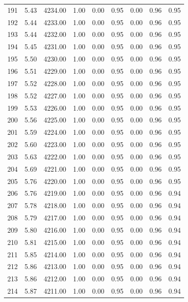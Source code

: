 \documentclass{article}\usepackage[]{graphicx}\usepackage[]{color}
\begin{document}
\begin{longtable}{rrrrrrrrr}
  191 & 5.43 & 4234.00 & 1.00 & 0.00 & 0.95 & 0.00 & 0.96 & 0.95 \\ 
  192 & 5.44 & 4233.00 & 1.00 & 0.00 & 0.95 & 0.00 & 0.96 & 0.95 \\ 
  193 & 5.44 & 4232.00 & 1.00 & 0.00 & 0.95 & 0.00 & 0.96 & 0.95 \\ 
  194 & 5.45 & 4231.00 & 1.00 & 0.00 & 0.95 & 0.00 & 0.96 & 0.95 \\ 
  195 & 5.50 & 4230.00 & 1.00 & 0.00 & 0.95 & 0.00 & 0.96 & 0.95 \\ 
  196 & 5.51 & 4229.00 & 1.00 & 0.00 & 0.95 & 0.00 & 0.96 & 0.95 \\ 
  197 & 5.52 & 4228.00 & 1.00 & 0.00 & 0.95 & 0.00 & 0.96 & 0.95 \\ 
  198 & 5.52 & 4227.00 & 1.00 & 0.00 & 0.95 & 0.00 & 0.96 & 0.95 \\ 
  199 & 5.53 & 4226.00 & 1.00 & 0.00 & 0.95 & 0.00 & 0.96 & 0.95 \\ 
  200 & 5.56 & 4225.00 & 1.00 & 0.00 & 0.95 & 0.00 & 0.96 & 0.95 \\ 
  201 & 5.59 & 4224.00 & 1.00 & 0.00 & 0.95 & 0.00 & 0.96 & 0.95 \\ 
  202 & 5.60 & 4223.00 & 1.00 & 0.00 & 0.95 & 0.00 & 0.96 & 0.95 \\ 
  203 & 5.63 & 4222.00 & 1.00 & 0.00 & 0.95 & 0.00 & 0.96 & 0.95 \\ 
  204 & 5.69 & 4221.00 & 1.00 & 0.00 & 0.95 & 0.00 & 0.96 & 0.95 \\ 
  205 & 5.76 & 4220.00 & 1.00 & 0.00 & 0.95 & 0.00 & 0.96 & 0.95 \\ 
  206 & 5.76 & 4219.00 & 1.00 & 0.00 & 0.95 & 0.00 & 0.96 & 0.94 \\ 
  207 & 5.78 & 4218.00 & 1.00 & 0.00 & 0.95 & 0.00 & 0.96 & 0.94 \\ 
  208 & 5.79 & 4217.00 & 1.00 & 0.00 & 0.95 & 0.00 & 0.96 & 0.94 \\ 
  209 & 5.80 & 4216.00 & 1.00 & 0.00 & 0.95 & 0.00 & 0.96 & 0.94 \\ 
  210 & 5.81 & 4215.00 & 1.00 & 0.00 & 0.95 & 0.00 & 0.96 & 0.94 \\ 
  211 & 5.85 & 4214.00 & 1.00 & 0.00 & 0.95 & 0.00 & 0.96 & 0.94 \\ 
  212 & 5.86 & 4213.00 & 1.00 & 0.00 & 0.95 & 0.00 & 0.96 & 0.94 \\ 
  213 & 5.86 & 4212.00 & 1.00 & 0.00 & 0.95 & 0.00 & 0.96 & 0.94 \\ 
  214 & 5.87 & 4211.00 & 1.00 & 0.00 & 0.95 & 0.00 & 0.96 & 0.94 \\ 

\end{longtable}
\end{document}

